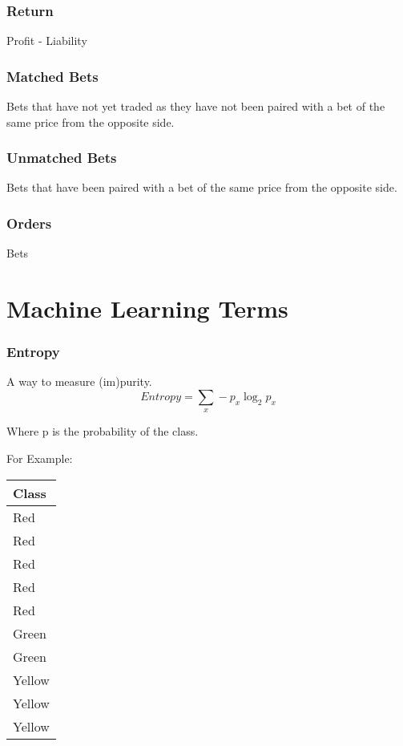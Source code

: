 		\subsubsection{Return}
		Profit - Liability
			
		\subsubsection{Matched Bets}
		Bets that have not yet traded as they have not been paired with a bet of the same price from the opposite side.
				
		\subsubsection{Unmatched Bets}
		Bets that have been paired with a bet of the same price from the opposite side.
		
		\subsubsection{Orders}
		Bets
		
		\section{Machine Learning Terms}
		
		\subsubsection{Entropy}
		A way to measure (im)purity.\\
		
		$$ Entropy = \sum_{x} -p_x \log_2 p_x$$	
		
		Where p is the probability of the class.
		
		For Example:\\
		
		\begin{table}[h]
			\begin{tabular}{l}
				Class 			\\
				\toprule
				Red\\
				Red\\
				Red\\
				Red\\
				Red\\
				Green\\
				Green\\
				Yellow\\
				Yellow\\
				Yellow\\
			\end{tabular}
		\end{table}	
		
